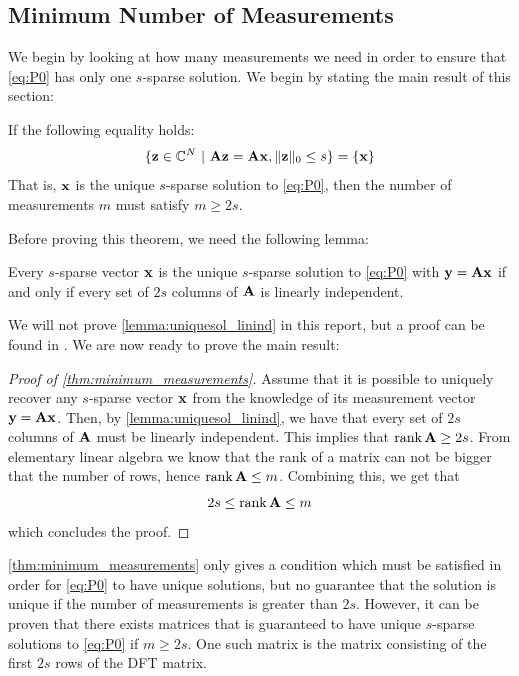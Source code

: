 \subsection{Minimum Number of Measurements}
\label{sec:minimum_measurements}
We begin by looking at how many measurements we need in order to ensure that \eqref{eq:P0} has only one $ s $-sparse solution. We begin by stating the main result of this section:
\begin{theorem}
	\label{thm:minimum_measurements}
	If the following equality holds: \[ \{\mathbf{z} \in \mathbb{C}^{N} ~|~ \mathbf{A}\mathbf{z} = \mathbf{A}\mathbf{x}, \lVert\mathbf{z}\rVert_{0} \leq s\}  = \{\mathbf{x}\} \] That is, $ \mathbf{x} $ is the unique $ s $-sparse solution to \eqref{eq:P0}, then the number of measurements $ m $ must satisfy $ m \geq 2s $.
\end{theorem}

Before proving this theorem, we need the following lemma:
\begin{lemma}
	\label{lemma:uniquesol_linind}
	Every $ s $-sparse vector $ \mathbf{x} $ is the unique $ s $-sparse solution to \eqref{eq:P0} with $ \mathbf{y} = \mathbf{A}\mathbf{x} $ if and only if every set of $ 2s $ columns of $ \mathbf{A} $ is linearly independent.
\end{lemma}

We will not prove \cref{lemma:uniquesol_linind} in this report, but a proof can be found in \cite[Theorem~2.13]{foucart13intro}. We are now ready to prove the main result:
\begin{proof}[Proof of \cref{thm:minimum_measurements}]
	Assume that it is possible to uniquely recover any $ s $-sparse vector $ \mathbf{x} $ from the knowledge of its measurement vector $ \mathbf{y} = \mathbf{A}\mathbf{x} $. Then, by \cref{lemma:uniquesol_linind}, we have that every set of $ 2s $ columns of $ \mathbf{A} $ must be linearly independent. This implies that $ \operatorname{rank} \mathbf{A} \geq 2s $. From elementary linear algebra we know that the rank of a matrix can not be bigger that the number of rows, hence $ \operatorname{rank} \mathbf{A} \leq m $. Combining this, we get that
	\[
		2s \leq \operatorname{rank} \mathbf{A} \leq m
	\]
	which concludes the proof.
\end{proof}

\cref{thm:minimum_measurements} only gives a condition which must be satisfied in order for \eqref{eq:P0} to have unique solutions, but no guarantee that the solution is unique if the number of measurements is greater than $ 2s $. However, it can be proven that there exists matrices that is guaranteed to have unique $ s $-sparse solutions to \eqref{eq:P0} if $ m \geq 2s $. One such matrix is the matrix consisting of the first $ 2s $ rows of the DFT matrix.

